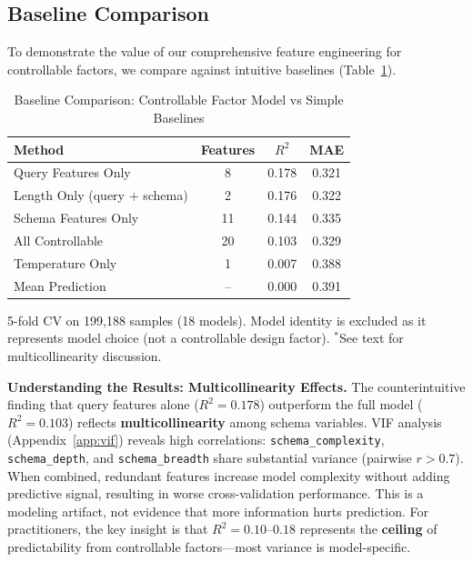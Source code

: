 \documentclass[sigconf,anonymous,review]{acmart}
\begin{document}
\subsection{Baseline Comparison}
\label{sec:shap}

To demonstrate the value of our comprehensive feature engineering for controllable factors, we compare against intuitive baselines (Table~\ref{tab:baselines}).

\begin{table}[t]
\centering
\caption{Baseline Comparison: Controllable Factor Model vs Simple Baselines}
\label{tab:baselines}
\small
\begin{tabular}{@{}lccc@{}}
\toprule
\textbf{Method} & \textbf{Features} & \textbf{$R^2$} & \textbf{MAE} \\
\midrule
Query Features Only & 8 & 0.178 & 0.321 \\
Length Only (query + schema) & 2 & 0.176 & 0.322 \\
Schema Features Only & 11 & 0.144 & 0.335 \\
All Controllable & 20 & 0.103 & 0.329 \\
Temperature Only & 1 & 0.007 & 0.388 \\
Mean Prediction & -- & 0.000 & 0.391 \\
\bottomrule
\end{tabular}
\vspace{0.5em}

\raggedright\footnotesize 5-fold CV on 199,188 samples (18 models). Model identity is excluded as it represents model choice (not a controllable design factor). $^*$See text for multicollinearity discussion.
\end{table}

\textbf{Understanding the Results: Multicollinearity Effects.} The counterintuitive finding that query features alone ($R^2 = 0.178$) outperform the full model ($R^2 = 0.103$) reflects \textbf{multicollinearity} among schema variables. VIF analysis (Appendix~\ref{app:vif}) reveals high correlations: \texttt{schema\_complexity}, \texttt{schema\_depth}, and \texttt{schema\_breadth} share substantial variance (pairwise $r > 0.7$). When combined, redundant features increase model complexity without adding predictive signal, resulting in worse cross-validation performance. This is a modeling artifact, not evidence that more information hurts prediction. For practitioners, the key insight is that $R^2 = 0.10$--$0.18$ represents the \textbf{ceiling} of predictability from controllable factors---most variance is model-specific.
\end{document}
